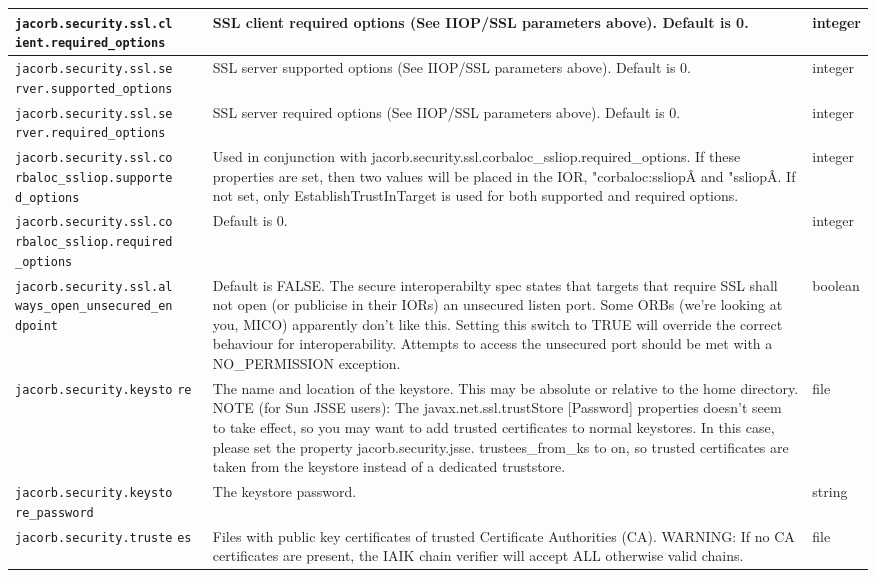 {{\begin{small}
\begin{longtable}{|p{5cm}|p{9cm}|p{2cm}|}
\hline
\verb"jacorb.security.ssl.cl"
\verb"ient.required_options" & SSL client required options (See IIOP/SSL parameters above). Default is 0. & integer \\
\hline
\verb"jacorb.security.ssl.se"
\verb"rver.supported_options" & SSL server supported options (See IIOP/SSL parameters above). Default is 0. & integer \\
\hline
\verb"jacorb.security.ssl.se"
\verb"rver.required_options" & SSL server required options (See IIOP/SSL parameters above). Default is 0. & integer \\
\hline
\verb"jacorb.security.ssl.co"
\verb"rbaloc_ssliop.supporte"
\verb"d_options" & Used in conjunction with jacorb.security.ssl.corbaloc\_ssliop.required\_options. If these properties are set, then two values will be placed in the IOR, "corbaloc:ssliopÂ and "ssliopÂ. If not set, only EstablishTrustInTarget is used for both supported and required options. & integer \\
\hline
\verb"jacorb.security.ssl.co"
\verb"rbaloc_ssliop.required"
\verb"_options" &  Default is 0. & integer \\
\hline
\verb"jacorb.security.ssl.al"
\verb"ways_open_unsecured_en"
\verb"dpoint" &  Default is FALSE. The secure interoperabilty spec states that targets that require SSL shall not open (or publicise in their IORs) an unsecured listen port. Some ORBs (we're looking at you, MICO) apparently don't like this. Setting this switch to TRUE will override the correct behaviour for interoperability. Attempts to access the unsecured port should be met with a NO\_PERMISSION exception. & boolean \\
\hline
\verb"jacorb.security.keysto"
\verb"re" & The name and location of the keystore. This may be absolute or relative to the home directory. NOTE (for Sun JSSE users): The javax.net.ssl.trustStore [Password] properties doesn't seem to take effect, so you may want to add trusted certificates to normal keystores. In this case, please set the property jacorb.security.jsse. trustees\_from\_ks to on, so trusted certificates are taken from the keystore instead of a dedicated truststore.  & file \\
\hline
\verb"jacorb.security.keysto"
\verb"re_password" & The keystore password. & string \\
\hline
\verb"jacorb.security.truste"
\verb"es" & Files with public key certificates of trusted Certificate Authorities (CA). WARNING: If no CA certificates are present, the IAIK chain verifier will accept ALL otherwise valid chains. & file \\

\end{longtable}
\end{small}}}
